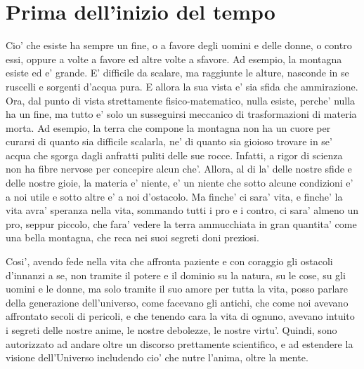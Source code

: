 \chapter{Prima dell'inizio del tempo}
Cio' che esiste ha sempre un fine, o a favore degli uomini e delle donne, o contro essi, oppure a volte a favore ed altre volte a sfavore. Ad esempio, la montagna esiste ed e' grande. E' difficile da scalare, ma raggiunte le alture, nasconde in se ruscelli e sorgenti d'acqua pura. E allora la sua vista e' sia sfida che ammirazione. Ora, dal punto di vista strettamente fisico-matematico, nulla esiste, perche' nulla ha un fine, ma tutto e' solo un susseguirsi meccanico di trasformazioni di materia morta.
Ad esempio, la terra che compone la montagna non ha un cuore per curarsi di quanto sia difficile scalarla, ne' di quanto sia gioioso trovare in se' acqua che sgorga dagli anfratti puliti delle sue rocce. Infatti, a rigor di scienza non ha fibre nervose per concepire alcun che'. Allora, al di la' delle nostre sfide e delle nostre gioie, la materia e' niente, e' un niente che sotto alcune condizioni e' a noi utile e sotto altre e' a noi d'ostacolo. Ma finche' ci sara' vita, e finche' la vita avra' speranza nella vita, sommando tutti i pro e i contro, ci sara' almeno un pro, seppur piccolo, che fara' vedere la terra ammucchiata in gran quantita' come una bella montagna, che reca nei suoi segreti doni preziosi.

Cosi', avendo fede nella vita che affronta paziente e con coraggio gli ostacoli d'innanzi a se, non tramite il potere e il dominio su la natura, su le cose, su gli uomini e le donne, ma solo tramite il suo amore per tutta la vita, posso parlare della generazione dell'universo, come facevano gli antichi, che come noi avevano affrontato secoli di pericoli, e che tenendo cara la vita di ognuno, avevano intuito i segreti delle nostre anime, le nostre debolezze, le nostre virtu'. Quindi, sono autorizzato ad andare oltre un discorso prettamente scientifico, e ad estendere la visione dell'Universo includendo cio' che nutre l'anima, oltre la mente.

